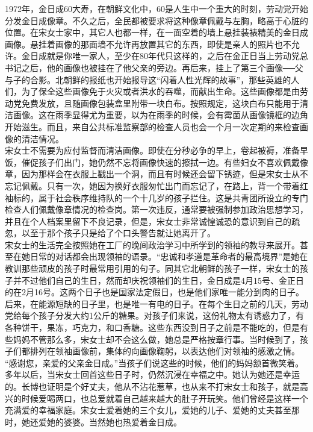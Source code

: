 1972年，金日成60大寿，在朝鲜文化中，60是人生中一个重大的时刻，劳动党开始分发金日成像章。不久之后，全民都被要求将这种像章佩戴与左胸，略高于心脏的位置。在宋女士家中，其它人也都一样，在一面空着的墙上悬挂装裱精美的金日成画像。悬挂着画像的那面墙不允许再放置其它的东西，即使是亲人的照片也不允许。金日成就是你唯一家人，至少在80年代只这样的，之后在金正日当上劳动党总书记之后，他的画像也被挂在了他父亲的旁边。再后来，挂上了第三个画像──父与子的合影。北朝鲜的报纸也开始报导这“闪着人性光辉的故事”，那些英雄的人们，为了保全这些画像免于火灾或者洪水的吞噬，而献出生命。这些画像都是由劳动党免费发放，且随画像包装盒里附带一块白布。按照规定，这块白布只能用于清洁画像。这在雨季显得尤为重要，以为在雨季的时候，会有霉菌从画像镜框的边角开始滋生。而且，来自公共标准监察部的检查人员也会一个月一次定期的来检查画像的清洁情况。\\

宋女士不需要为应付监督而清洁画像。即使在分秒必争的早上，卷起被褥，准备早饭，催促孩子们出门，她仍然不忘将画像快速的擦拭一边。有些妇女不喜欢佩戴像章，因为那样会在衣服上戳出一个洞，而且有时候还会留下锈迹，但是宋女士从不忘记佩戴。只有一次，她因为换好衣服匆忙出门而忘记了，在路上，背一个带着红袖标的，属于社会秩序维持队的一个十几岁的孩子拦住。这是共青团所设立的专门检查人们佩戴像章情况的检查岗。第一次违反，通常要被强制参加政治思想学习，并且在个人档案里留下不良记录，但是，宋女士非常诚惶诚恐的意识到自己的疏忽，以至于那个孩子只是给了个口头警告就让她离开了。\\

宋女士的生活完全按照她在工厂的晚间政治学习中所学到的领袖的教导来展开。甚至在她日常的对话都会出现领袖的语录。“忠诚和孝道是革命者的最高境界”是她在教训那些顽皮的孩子时最常用引用的句子。同其它北朝鲜的孩子一样，宋女士的孩子并不过他们自己的生日，然而却庆祝领袖们的生日，金日成是4月15号、金正日的在2月16号。这两个日子也是国家法定假日，也是他们家唯一能分到肉的日子。后来，在能源短缺的日子里，也是唯一有电的日子。在每个生日之前的几天，劳动党给每个孩子分发大约1公斤的糖果。对孩子们来说，这份礼物太有诱惑力了，有各种饼干，果冻，巧克力，和口香糖。这些东西没到日子之前是不能吃的，但是有些妈妈不管那么多，宋女士却不会这么做，她总是严格按章行事。当时候到了，孩子们都排列在领袖画像前，集体的向画像鞠躬，以表达他们对领袖的感激之情。\\

“感谢您，亲爱的父亲金日成。”当孩子们说这些的时候，他们的妈妈颔首微笑着。\\

多年以后，当宋女士回首这些日子时，仍然沉浸在幸福之中。她认为她还是幸运的。长博也证明是个好丈夫，他从不沾花惹草，也从来不打宋女士和孩子，就是高兴的时候爱喝两口，也总爱就着自己越来越大的肚子开玩笑。他们曾经是这样一个充满爱的幸福家庭。宋女士爱着她的三个女儿，爱她的儿子、爱她的丈夫甚至那时，她还爱她的婆婆。当然她也热爱着金日成。\\

